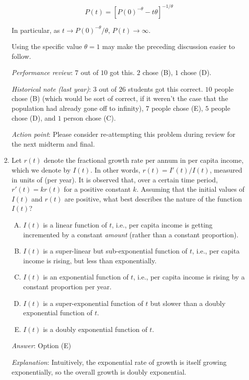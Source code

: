 \documentclass[10pt]{amsart}
\begin{document}
\begin{enumerate}
  $$P(t) = [P(0)^{-\theta} - t\theta]^{-1/\theta}$$

  In particular, as $t \to P(0)^{-\theta}/\theta$, $P(t) \to \infty$.

  Using the specific value $\theta = 1$ may make the preceding
  discussion easier to follow.

  {\em Performance review}: $7$ out of $10$ got this. $2$ chose (B),
  $1$ chose (D).

  {\em Historical note (last year)}: $3$ out of $26$ students got this
  correct. $10$ people chose (B) (which would be sort of correct, if
  it weren't the case that the population had already gone off to
  infinity), $7$ people chose (E), $5$ people chose (D), and $1$
  person chose (C).

  {\em Action point}: Please consider re-attempting this problem
  during review for the next midterm and final.

\item Let $r(t)$ denote the fractional growth rate per annum in per
  capita income, which we denote by $I(t)$. In other words, $r(t) =
  I'(t)/I(t)$, measured in units of (per year). It is observed that,
  over a certain time period, $r'(t) = kr(t)$ for a positive constant
  $k$. Assuming that the initial values of $I(t)$ and $r(t)$ are
  positive, what best describes the nature of the function $I(t)$?

  \begin{enumerate}[(A)]
  \item $I(t)$ is a linear function of $t$, i.e., per capita income is
    getting incremented by a constant {\em amount} (rather than a
    constant proportion).
  \item $I(t)$ is a super-linear but sub-exponential function of $t$,
    i.e., per capita income is rising, but less than exponentially.
  \item $I(t)$ is an exponential function of $t$, i.e., per capita
    income is rising by a constant proportion per year.
  \item $I(t)$ is a super-exponential function of $t$ but slower than
    a doubly exponential function of $t$.
  \item $I(t)$ is a doubly exponential function of $t$.
  \end{enumerate}

  {\em Answer}: Option (E)
  
  {\em Explanation}: Intuitively, the exponential rate of growth is
  itself growing exponentially, so the overall growth is doubly
  exponential.


\end{enumerate}
\end{document}
